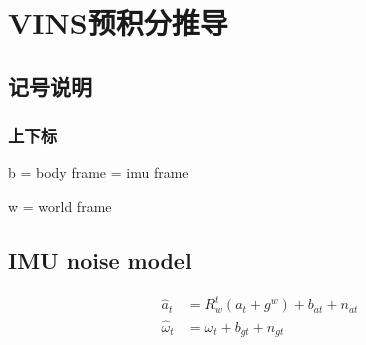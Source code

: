 \section{VINS预积分推导}
\subsection{记号说明}
\subsubsection{上下标}
\par b = body frame = imu frame
\par w = world frame

\subsection{IMU noise model}
\begin{equation}
	\begin{split}
		\hat{a}_t &= R_w^t(a_t+g^w)+b_{at}+n_{at}\\  \hat{\omega}_t &= \omega_t+b_{gt}+n_{gt}
	\end{split}
\end{equation}

